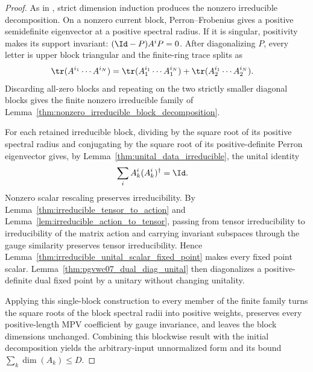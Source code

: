 \begin{proof}\leanok
    As in \cite[Theorem~4]{PerezGarcia2007Matrix}, strict dimension induction
    produces the nonzero irreducible decomposition. On a nonzero
    current block, Perron--Frobenius gives a positive semidefinite eigenvector
    at a positive spectral radius. If it is singular, positivity makes its
    support invariant: $(\Id-P)A^iP=0$. After diagonalizing $P$, every letter is
    upper block triangular and the finite-ring trace splits as
    \begin{align}
        \tr(A^{i_1}\cdots A^{i_N})
         & =\tr(A_1^{i_1}\cdots A_1^{i_N})
        +\tr(A_2^{i_1}\cdots A_2^{i_N}).
        \notag
    \end{align}
    Discarding all-zero blocks and repeating on the two strictly smaller
    diagonal blocks gives the finite nonzero irreducible family of
    Lemma~\ref{thm:nonzero_irreducible_block_decomposition}.

    For each retained irreducible block, dividing by the square root of its
    positive spectral radius and conjugating by the square root of its
    positive-definite Perron eigenvector gives, by
    Lemma~\ref{thm:unital_data_irreducible}, the unital identity
    \begin{align}
        \sum_i A_k^i(A_k^i)^\dagger
         & =\Id.
        \notag
    \end{align}
    Nonzero scalar rescaling preserves irreducibility. By
    Lemma~\ref{thm:irreducible_tensor_to_action} and
    Lemma~\ref{lem:irreducible_action_to_tensor}, passing from tensor
    irreducibility to irreducibility of the matrix action and carrying
    invariant subspaces through the gauge similarity preserves tensor
    irreducibility. Hence
    Lemma~\ref{thm:irreducible_unital_scalar_fixed_point} makes every fixed
    point scalar. Lemma~\ref{thm:pgvwc07_dual_diag_unital} then diagonalizes a
    positive-definite dual fixed point by a unitary without changing unitality.

    Applying this single-block construction to every member of the finite family
    turns the square roots of the block spectral radii into positive weights,
    preserves every positive-length MPV coefficient by gauge invariance, and
    leaves the block dimensions unchanged. Combining this blockwise result with
    the initial decomposition yields the arbitrary-input unnormalized form and
    its bound $\sum_k\dim(A_k)\le D$.
\end{proof}

